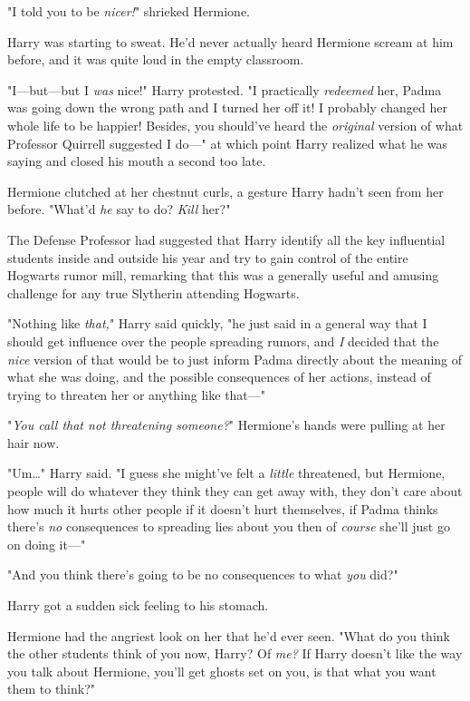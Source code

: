 "I told you to be \emph{nicer!}" shrieked Hermione.

Harry was starting to sweat. He'd never actually heard Hermione scream at him 
before, and it was quite loud in the empty classroom.

"I---but---but I \emph{was} nice!" Harry protested. "I practically 
\emph{redeemed} her, Padma was going down the wrong path and I turned her off 
it! I probably changed her whole life to be happier! Besides, you should've 
heard the \emph{original} version of what Professor Quirrell suggested I do---" 
at which point Harry realized what he was saying and closed his mouth a second 
too late.

Hermione clutched at her chestnut curls, a gesture Harry hadn't seen from her 
before. "What'd \emph{he} say to do? \emph{Kill} her?"

The Defense Professor had suggested that Harry identify all the key influential 
students inside and outside his year and try to gain control of the entire 
Hogwarts rumor mill, remarking that this was a generally useful and amusing 
challenge for any true Slytherin attending Hogwarts.

"Nothing like \emph{that,}" Harry said quickly, "he just said in a general way 
that I should get influence over the people spreading rumors, and \emph{I} 
decided that the \emph{nice} version of that would be to just inform Padma 
directly about the meaning of what she was doing, and the possible consequences 
of her actions, instead of trying to threaten her or anything like that---"

"\emph{You call that not threatening someone?}" Hermione's hands were pulling 
at her hair now.

"Um{\ldots}" Harry said. "I guess she might've felt a \emph{little} threatened, 
but Hermione, people will do whatever they think they can get away with, they 
don't care about how much it hurts other people if it doesn't hurt themselves, 
if Padma thinks there's \emph{no} consequences to spreading lies about you then 
of \emph{course} she'll just go on doing it---"

"And you think there's going to be no consequences to what \emph{you} did?"

Harry got a sudden sick feeling to his stomach.

Hermione had the angriest look on her that he'd ever seen. "What do you think 
the other students think of you now, Harry? Of \emph{me?} If Harry doesn't like 
the way you talk about Hermione, you'll get ghosts set on you, is that what you 
want them to think?"

